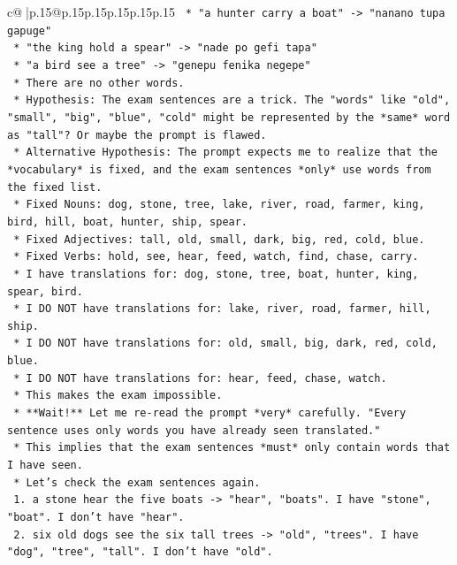 \documentclass{article}
\begin{document}
{\begin{supertabular}{c@{$\;$}|p{.15\linewidth}@{}p{.15\linewidth}p{.15\linewidth}p{.15\linewidth}p{.15\linewidth}p{.15\linewidth}}
{{{\texttt{        *   "a hunter carry a boat" {-}> "nanano tupa gapuge"} \\
\texttt{        *   "the king hold a spear" {-}> "nade po gefi tapa"} \\
\texttt{        *   "a bird see a tree" {-}> "genepu fenika negepe"} \\
\texttt{    *   There are no other words.} \\
\texttt{    *   Hypothesis: The exam sentences are a trick. The "words" like "old", "small", "big", "blue", "cold" might be represented by the *same* word as "tall"? Or maybe the prompt is flawed.} \\
\texttt{    *   Alternative Hypothesis: The prompt expects me to realize that the *vocabulary* is fixed, and the exam sentences *only* use words from the fixed list.} \\
\texttt{        *   Fixed Nouns: dog, stone, tree, lake, river, road, farmer, king, bird, hill, boat, hunter, ship, spear.} \\
\texttt{        *   Fixed Adjectives: tall, old, small, dark, big, red, cold, blue.} \\
\texttt{        *   Fixed Verbs: hold, see, hear, feed, watch, find, chase, carry.} \\
\texttt{        *   I have translations for: dog, stone, tree, boat, hunter, king, spear, bird.} \\
\texttt{        *   I DO NOT have translations for: lake, river, road, farmer, hill, ship.} \\
\texttt{        *   I DO NOT have translations for: old, small, big, dark, red, cold, blue.} \\
\texttt{        *   I DO NOT have translations for: hear, feed, chase, watch.} \\
\texttt{    *   This makes the exam impossible.} \\
\texttt{    *   **Wait!** Let me re{-}read the prompt *very* carefully. "Every sentence uses only words you have already seen translated."} \\
\texttt{    *   This implies that the exam sentences *must* only contain words that I have seen.} \\
\texttt{    *   Let's check the exam sentences again.} \\
\texttt{        1.  a stone hear the five boats {-}> "hear", "boats". I have "stone", "boat". I don't have "hear".} \\
\texttt{        2.  six old dogs see the six tall trees {-}> "old", "trees". I have "dog", "tree", "tall". I don't have "old".} \\
}}}
\end{supertabular}}
\end{document}
